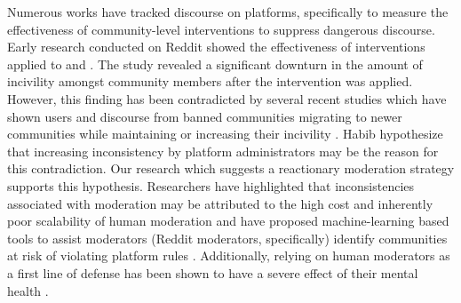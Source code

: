 % 
Numerous works have tracked discourse on platforms, specifically to measure the
effectiveness of community-level interventions to suppress dangerous discourse.
Early research conducted on Reddit \cite{eshwar2017you} showed the
effectiveness of interventions applied to  and
. The study revealed a significant downturn in the amount
of incivility amongst community members after the intervention was applied.
However, this finding has been contradicted by several recent studies which
have shown users and discourse from banned communities migrating to newer
communities while maintaining or increasing their incivility
\cite{habib2019act, ali2021understanding}. Habib \etal hypothesize that
increasing inconsistency by platform administrators may be the reason for this
contradiction. Our research which suggests a reactionary moderation strategy
supports this hypothesis.
%
Researchers have highlighted that inconsistencies associated with
moderation may be attributed to the high cost and inherently poor scalability
of human moderation and have proposed machine-learning based tools to assist
moderators (Reddit moderators, specifically) identify communities at risk of
violating platform rules \cite{habib2019act, 2019crossmod}. Additionally,
relying on human moderators as a first line of defense has been shown to have
a severe effect of their mental health \cite{We-are-the-nerds,
roberts2014behind, wohn2019volunteer}. 

